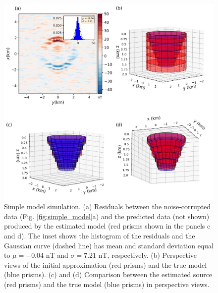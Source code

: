 
\begin{figure}
	\centering
	\includegraphics[width=\linewidth]{figures/simple_results.png}
	\caption{Simple model simulation. (a) Residuals between the  noise-corrupted data (Fig. \ref{fig:simple_model}a) and the predicted data (not shown) produced by the estimated model (red prisms shown in the panels c and d). The inset shows the histogram of the residuals and the Gaussian curve (dashed line) has mean and standard deviation equal to $\mu = -0.04$ nT and $\sigma=7.21$ nT, respectively. (b) Perspective views of the initial approximation (red prisms) and the true model (blue prisms). (c) and (d) Comparison between the estimated source (red prisms) and the true model (blue prisms) in perspective views.}
	\label{fig:simple_results}
\end{figure}

